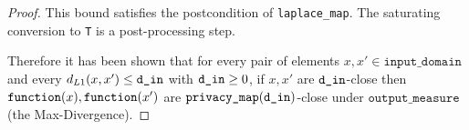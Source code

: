 \documentclass{article}
\begin{document}
\begin{proof}
This bound satisfies the postcondition of \texttt{laplace\_map}.
The saturating conversion to \texttt{T} is a post-processing step.

Therefore it has been shown that for every pair of elements $x, x' \in \texttt{input\_domain}$ and every $d_{L1}(x, x') \le \texttt{d\_in}$ with $\texttt{d\_in} \ge 0$, 
if $x, x'$ are $\texttt{d\_in}$-close then $\texttt{function}(x),\texttt{function}(x')$ are $\texttt{privacy\_map}(\texttt{d\_in})$-close under $\texttt{output\_measure}$ (the Max-Divergence).
\end{proof}
\end{document}
